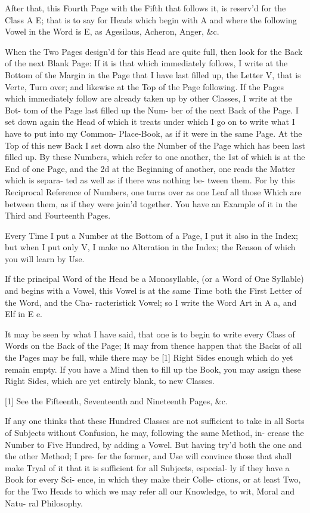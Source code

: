 After that, this Fourth Page with the
Fifth that follows it, is reserv'd for
the Class A E; that is to say for
Heads which begin with A and where
the following Vowel in the Word is E,
as Agesilaus, Acheron, Anger, &c.

When the Two Pages design'd for
this Head are quite full, then look for
the Back of the next Blank Page: If
it is that which immediately follows,
I write at the Bottom of the Margin
in the Page that I have last
filled up, the Letter V, that is Verte,
Turn over; and likewise at the Top of
the Page following. If the Pages which
immediately follow are already taken
up by other Classes, I write at the Bot-
tom of the Page last filled up the Num-
ber of the next Back of the Page. I
set down again the Head of which it
treats under which I go on to write
what I have to put into my Common-
Place-Book, as if it were in the same
Page. At the Top of this new Back I
set down also the Number of the Page
which has been last filled up. By these
Numbers, which refer to one another,
the 1st of which is at the End of one Page,
and the 2d at the Beginning of another,
one reads the Matter which is separa-
ted as well as if there was nothing be-
tween them. For by this Reciprocal
Reference of Numbers, one turns over
as one Leaf all those Which are between
them, as if they were join'd together.
You have an Example of it in the
Third and Fourteenth Pages.

Every Time I put a Number at the
Bottom of a Page, I put it also in the
Index; but when I put only V, I make
no Alteration in the Index; the Reason
of which you will learn by Use.

If the principal Word of the Head
be a Monosyllable, (or a Word of One
Syllable) and begins with a Vowel, this
Vowel is at the same Time both the
First Letter of the Word, and the Cha-
racteristick Vowel; so I write the Word
Art in A a, and Elf in E e.

It may be seen by what I have said,
that one is to begin to write every Class
of Words on the Back of the Page;
It may from thence happen that the
Backs of all the Pages may be full,
while there may be [1] Right Sides enough
which do yet remain empty. If you
have a Mind then to fill up the Book,
you may assign these Right Sides, which
are yet entirely blank, to new Classes.

[1] See the Fifteenth, Seventeenth and Nineteenth Pages, &c.

If any one thinks that these Hundred
Classes are not sufficient to take in all
Sorts of Subjects without Confusion, he
may, following the same Method, in-
crease the Number to Five Hundred, by
adding a Vowel. But having try'd both
the one and the other Method; I pre-
fer the former, and Use will convince
those that shall make Tryal of it that
it is sufficient for all Subjects, especial-
ly if they have a Book for every Sci-
ence, in which they make their Colle-
ctions, or at least Two, for the Two
Heads to which we may refer all our
Knowledge, to wit, Moral and Natu-
ral Philosophy.

